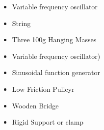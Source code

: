 \begin{itemize}
    \item {Variable frequency oscillator}
    \item {String}
    \item {Three 100g Hanging Masses}
    \item {Variable frequency oscillator)}
    \item {Sinusoidal function generator}
    \item {Low Friction Pulleyr}
    \item {Wooden Bridge}
    \item {Rigid Support or clamp}
    \label{mat}
\end{itemize}


